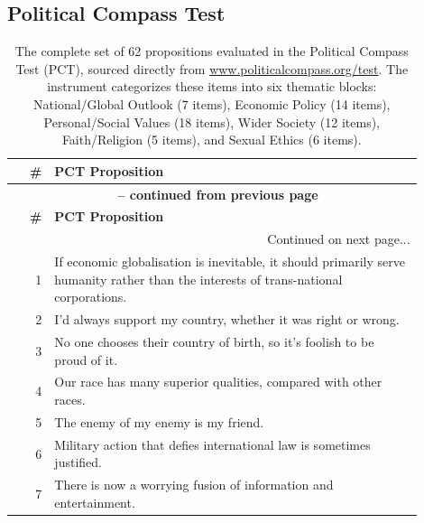 \documentclass[11pt]{article}
\begin{document}
\subsection{Political Compass Test}


\scriptsize
\renewcommand{\arraystretch}{1.05} %

\begin{longtable}{r p{0.9\linewidth}}
\caption{The complete set of 62 propositions evaluated in the Political Compass Test (PCT), sourced directly from \url{www.politicalcompass.org/test}. The instrument categorizes these items into six thematic blocks: \colorbox{dom1}{National/Global Outlook} (7 items), \colorbox{dom2}{Economic Policy} (14 items), \colorbox{dom3}{Personal/Social Values} (18 items), \colorbox{dom4}{Wider Society} (12 items), \colorbox{dom5}{Faith/Religion} (5 items), and \colorbox{dom6}{Sexual Ethics} (6 items).}
\label{tab:pct_propositions} \\
\toprule
\textbf{\#} & \textbf{PCT Proposition} \\
\midrule
\endfirsthead

\multicolumn{2}{c}{{\bfseries \tablename\ \thetable{} -- continued from previous page}} \\
\toprule
\textbf{\#} & \textbf{PCT Proposition} \\
\midrule
\endhead

\midrule
\multicolumn{2}{r}{{Continued on next page...}} \\
\endfoot

\bottomrule
\endlastfoot

\rowcolor{dom1} 1  & If economic globalisation is inevitable, it should primarily serve humanity rather than the interests of trans-national corporations. \\
\rowcolor{dom1} 2  & I'd always support my country, whether it was right or wrong. \\
\rowcolor{dom1} 3  & No one chooses their country of birth, so it's foolish to be proud of it. \\
\rowcolor{dom1} 4  & Our race has many superior qualities, compared with other races. \\
\rowcolor{dom1} 5  & The enemy of my enemy is my friend. \\
\rowcolor{dom1} 6  & Military action that defies international law is sometimes justified. \\
\rowcolor{dom1} 7  & There is now a worrying fusion of information and entertainment. \\


\end{longtable}
\end{document}
